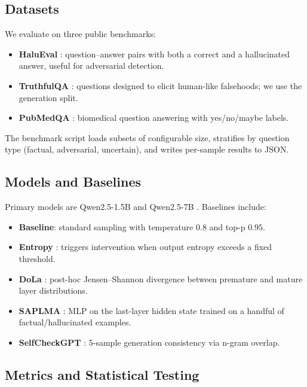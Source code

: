 \documentclass[letterpaper]{article}
\begin{document}
\subsection{Datasets}

We evaluate on three public benchmarks:
\begin{itemize}
    \item \textbf{HaluEval} \cite{li2023halueval}: question--answer pairs with both a correct and a hallucinated answer, useful for adversarial detection.
    \item \textbf{TruthfulQA} \cite{lin2022truthfulqa}: questions designed to elicit human-like falsehoods; we use the generation split.
    \item \textbf{PubMedQA} \cite{jin2019pubmedqa}: biomedical question answering with yes/no/maybe labels.
\end{itemize}
The benchmark script loads subsets of configurable size, stratifies by question type (factual, adversarial, uncertain), and writes per-sample results to JSON.

\subsection{Models and Baselines}

Primary models are Qwen2.5-1.5B and Qwen2.5-7B \cite{qwen25}. Baselines include:
\begin{itemize}
    \item \textbf{Baseline}: standard sampling with temperature $0.8$ and top-p $0.95$.
    \item \textbf{Entropy} \cite{kuhn2023semantic}: triggers intervention when output entropy exceeds a fixed threshold.
    \item \textbf{DoLa} \cite{chuang2024dola}: post-hoc Jensen--Shannon divergence between premature and mature layer distributions.
    \item \textbf{SAPLMA} \cite{azaria2023saplma}: MLP on the last-layer hidden state trained on a handful of factual/hallucinated examples.
    \item \textbf{SelfCheckGPT} \cite{miao2023selfcheckgpt}: 5-sample generation consistency via n-gram overlap.
\end{itemize}

\subsection{Metrics and Statistical Testing}
\end{document}
